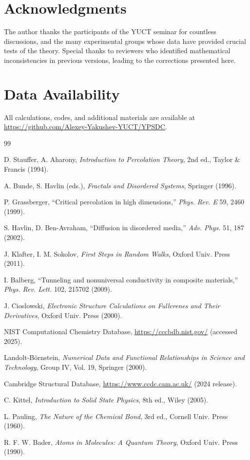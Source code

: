 \documentclass[12pt,a4paper]{article}
\theoremstyle{remark}
\begin{document}
	\section*{Acknowledgments}
	
	The author thanks the participants of the YUCT seminar for countless discussions, and the many experimental groups whose data have provided crucial tests of the theory. Special thanks to reviewers who identified mathematical inconsistencies in previous versions, leading to the corrections presented here.
	
	\section*{Data Availability}
	
	All calculations, codes, and additional materials are available at \url{https://github.com/Alexey-Yakushev-YUCT/YPSDC}.
	
	\begin{thebibliography}{99}
		
		
		D. Stauffer, A. Aharony, \emph{Introduction to Percolation Theory}, 2nd ed., Taylor \& Francis (1994).
		
		A. Bunde, S. Havlin (eds.), \emph{Fractals and Disordered Systems}, Springer (1996).
		
		P. Grassberger, ``Critical percolation in high dimensions,'' \emph{Phys. Rev. E} 59, 2460 (1999).
		
		S. Havlin, D. Ben-Avraham, ``Diffusion in disordered media,'' \emph{Adv. Phys.} 51, 187 (2002).
		
		J. Klafter, I. M. Sokolov, \emph{First Steps in Random Walks}, Oxford Univ. Press (2011).
		
		I. Balberg, ``Tunneling and nonuniversal conductivity in composite materials,'' \emph{Phys. Rev. Lett.} 102, 215702 (2009).
		
		J. Cioslowski, \emph{Electronic Structure Calculations on Fullerenes and Their Derivatives}, Oxford Univ. Press (2000).
		
		NIST Computational Chemistry Database, \url{https://cccbdb.nist.gov/} (accessed 2025).
		
		Landolt-Börnstein, \emph{Numerical Data and Functional Relationships in Science and Technology}, Group IV, Vol. 19, Springer (2000).
		
		Cambridge Structural Database, \url{https://www.ccdc.cam.ac.uk/} (2024 release).
		
		C. Kittel, \emph{Introduction to Solid State Physics}, 8th ed., Wiley (2005).
		
		L. Pauling, \emph{The Nature of the Chemical Bond}, 3rd ed., Cornell Univ. Press (1960).
		
		R. F. W. Bader, \emph{Atoms in Molecules: A Quantum Theory}, Oxford Univ. Press (1990).
		
	\end{thebibliography}
	
\end{document}
